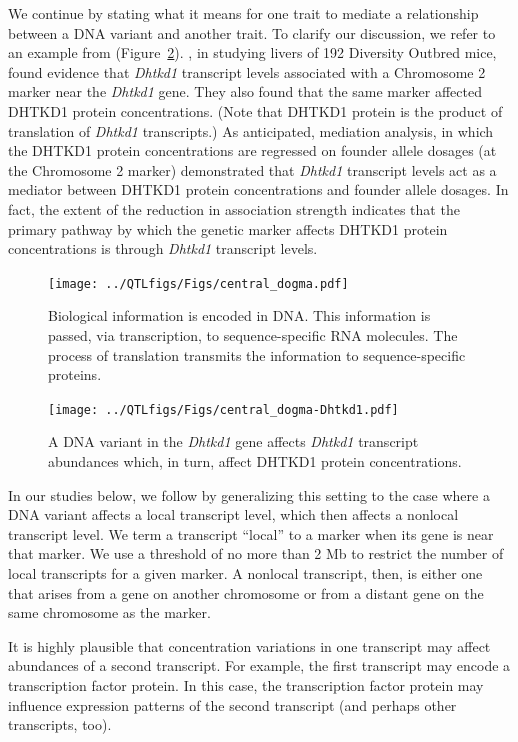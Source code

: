 \documentclass[oneside]{book}\usepackage[]{graphicx}\usepackage[]{color}
\begin{document}
We continue by stating what it means for one trait to mediate a relationship between a 
DNA variant and another trait. To clarify our discussion, we refer to an example from 
\citet{chick2016defining} (Figure~\ref{fig:Dhtkd1}). \citet{chick2016defining}, in 
studying livers of 192 Diversity Outbred mice, found evidence that \emph{Dhtkd1} 
transcript levels associated with a Chromosome 2 marker near the \emph{Dhtkd1} gene. 
They also found that 
the same marker affected DHTKD1 protein concentrations. (Note that DHTKD1 protein is the product of translation of \emph{Dhtkd1} transcripts.)
As anticipated, mediation analysis, in which the DHTKD1 protein concentrations are
regressed on founder allele dosages (at the Chromosome 2 marker) demonstrated that
\emph{Dhtkd1} transcript levels act as a mediator between DHTKD1 protein concentrations 
and founder allele dosages. In fact, the extent of the reduction in association 
strength indicates that the primary pathway by which the genetic marker affects DHTKD1 
protein concentrations is through \emph{Dhtkd1} transcript levels.

\begin{figure}
  \centering
  \texttt{[image: ../QTLfigs/Figs/central\_dogma.pdf]}
  \caption{Biological information is encoded in DNA. This information is passed, via transcription, to sequence-specific RNA molecules. The process of translation transmits the information to sequence-specific proteins.}\label{fig:dogma}
\end{figure}


\begin{figure}
  \centering
  \texttt{[image: ../QTLfigs/Figs/central\_dogma-Dhtkd1.pdf]}
  \caption{A DNA variant in the \emph{Dhtkd1} gene affects \emph{Dhtkd1} transcript abundances which, in turn, affect DHTKD1 protein concentrations.}\label{fig:Dhtkd1}
\end{figure}


In our studies below, we follow \citet{keller2018genetic} by generalizing this setting to the case where a DNA variant affects a local transcript level, which then affects a nonlocal transcript level. 
We term a transcript ``local'' to a marker when its gene is near that marker. 
We use a threshold of no more than 2 Mb to restrict the 
number of local transcripts for a given marker. 
A nonlocal transcript, then, is either one that arises from a gene on another chromosome or from a distant gene on the same chromosome as the marker.

It is highly plausible that concentration variations in one transcript may 
affect abundances of a second transcript. 
For example, the first transcript may encode a transcription factor protein. 
In this case, the transcription factor protein may influence expression 
patterns of the second transcript (and perhaps other transcripts, too). 
\end{document}
